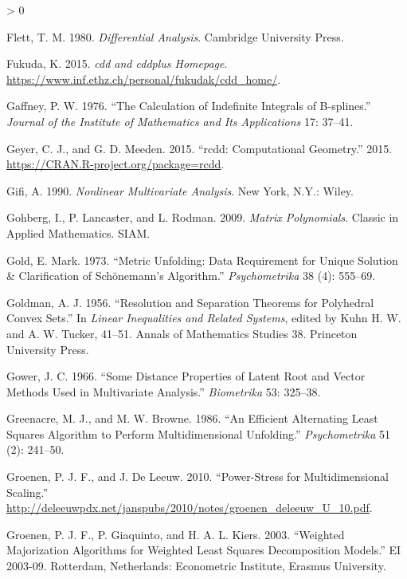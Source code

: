 \documentclass[
  12pt,
]{book}
\newlength{\cslhangindent}
\newenvironment{CSLReferences}[2] %
 {%
  \setlength{\parindent}{0pt}
  \ifodd #1 \everypar{\setlength{\hangindent}{\cslhangindent}}\ignorespaces\fi
  \ifnum #2 > 0
  \setlength{\parskip}{#2\baselineskip}
  \fi
 }%
 {}
\theoremstyle{definition}
\theoremstyle{definition}
\theoremstyle{definition}
\theoremstyle{definition}
\theoremstyle{remark}
\begin{document}
\begin{CSLReferences}{1}{0}
\leavevmode\hypertarget{ref-flett_80}{}%
Flett, T. M. 1980. \emph{{Differential Analysis}}. Cambridge University Press.

\leavevmode\hypertarget{ref-fukuda_15}{}%
Fukuda, K. 2015. \emph{{cdd and cddplus Homepage}}. \url{https://www.inf.ethz.ch/personal/fukudak/cdd_home/}.

\leavevmode\hypertarget{ref-gaffney_76}{}%
Gaffney, P. W. 1976. {``{The Calculation of Indefinite Integrals of B-splines}.''} \emph{Journal of the Institute of Mathematics and Its Applications} 17: 37--41.

\leavevmode\hypertarget{ref-geyer_meeden_15}{}%
Geyer, C. J., and G. D. Meeden. 2015. {``{rcdd: Computational Geometry}.''} 2015. \url{https://CRAN.R-project.org/package=rcdd}.

\leavevmode\hypertarget{ref-gifi_B_90}{}%
Gifi, A. 1990. \emph{Nonlinear Multivariate Analysis}. New York, N.Y.: Wiley.

\leavevmode\hypertarget{ref-gohberg_lancaster_rodman_09}{}%
Gohberg, I., P. Lancaster, and L. Rodman. 2009. \emph{Matrix Polynomials}. Classic in Applied Mathematics. SIAM.

\leavevmode\hypertarget{ref-gold_73}{}%
Gold, E. Mark. 1973. {``{Metric Unfolding: Data Requirement for Unique Solution \& Clarification of Sch{ö}nemann's Algorithm}.''} \emph{Psychometrika} 38 (4): 555--69.

\leavevmode\hypertarget{ref-goldman_56}{}%
Goldman, A. J. 1956. {``{Resolution and Separation Theorems for Polyhedral Convex Sets}.''} In \emph{Linear Inequalities and Related Systems}, edited by Kuhn H. W. and A. W. Tucker, 41--51. Annals of Mathematics Studies 38. Princeton University Press.

\leavevmode\hypertarget{ref-gower_66}{}%
Gower, J. C. 1966. {``{Some Distance Properties of Latent Root and Vector Methods Used in Multivariate Analysis}.''} \emph{Biometrika} 53: 325--38.

\leavevmode\hypertarget{ref-greenacre_browne_86}{}%
Greenacre, M. J., and M. W. Browne. 1986. {``{An Efficient Alternating Least Squares Algorithm to Perform Multidimensional Unfolding}.''} \emph{Psychometrika} 51 (2): 241--50.

\leavevmode\hypertarget{ref-groenen_deleeuw_U_10}{}%
Groenen, P. J. F., and J. De Leeuw. 2010. {``{Power-Stress for Multidimensional Scaling}.''} \url{http://deleeuwpdx.net/janspubs/2010/notes/groenen_deleeuw_U_10.pdf}.

\leavevmode\hypertarget{ref-groenen_giaquinto_kiers_03}{}%
Groenen, P. J. F., P. Giaquinto, and H. A. L. Kiers. 2003. {``{Weighted Majorization Algorithms for Weighted Least Squares Decomposition Models}.''} EI 2003-09. Rotterdam, Netherlands: Econometric Institute, Erasmus University.


\end{CSLReferences}
\end{document}
